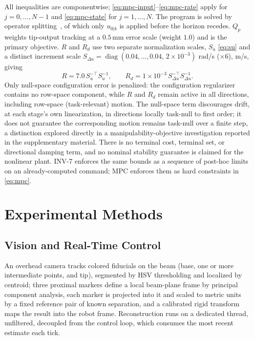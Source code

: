 \documentclass[journal]{IEEEtran}
\begin{document}
All inequalities are componentwise; \eqref{eq:mpc-input}--\eqref{eq:mpc-rate}
apply for $j=0,\dots,N-1$ and \eqref{eq:mpc-state} for $j=1,\dots,N$. The
program is solved by operator splitting~\cite{osqp2020}, of which only
$u_{0|k}$ is applied before the horizon recedes. $Q_p$ weights tip-output
tracking at a $0.5$\,mm error scale (weight $1.0$) and is the primary
objective. $R$ and $R_d$ use two separate normalization scales, $S_u$
\eqref{eq:su} and a distinct increment scale
$S_{\Delta u}=\operatorname{diag}(0.04,\dots,0.04,\,2\times10^{-3})$
rad/s ($\times6$), m/s, giving
\begin{equation}
R = 7.0\,S_u^{-\top}S_u^{-1}, \qquad
R_d = 1\times10^{-3}\,S_{\Delta u}^{-\top}S_{\Delta u}^{-1}.
\label{eq:r-rd}
\end{equation}
Only null-space configuration error is penalized: the configuration
regularizer contains no row-space component, while $R$ and $R_d$ remain
active in all directions, including row-space (task-relevant) motion. The
null-space term discourages drift, at each stage's own linearization, in
directions locally task-null to first order; it does not guarantee the
corresponding motion remains task-null over a finite step, a distinction
explored directly in a manipulability-objective investigation reported in
the supplementary material. There is no terminal cost, terminal set, or
directional damping term, and no nominal stability guarantee is claimed
for the nonlinear plant. INV-7 enforces the same bounds as a sequence of
post-hoc limits on an already-computed command; MPC enforces them as hard
constraints in \eqref{eq:mpc}.

\section{Experimental Methods}
\label{sec:experiments}

\subsection{Vision and Real-Time Control}
\label{sec:online}

An overhead camera tracks colored fiducials on the beam (base, one or
more intermediate points, and tip), segmented by HSV thresholding and
localized by centroid; three proximal markers define a local beam-plane
frame by principal component analysis, each marker is projected into it
and scaled to metric units by a fixed reference pair of known separation,
and a calibrated rigid transform maps the result into the robot frame.
Reconstruction runs on a dedicated thread, unfiltered, decoupled from the
control loop, which consumes the most recent estimate each tick.
\end{document}
